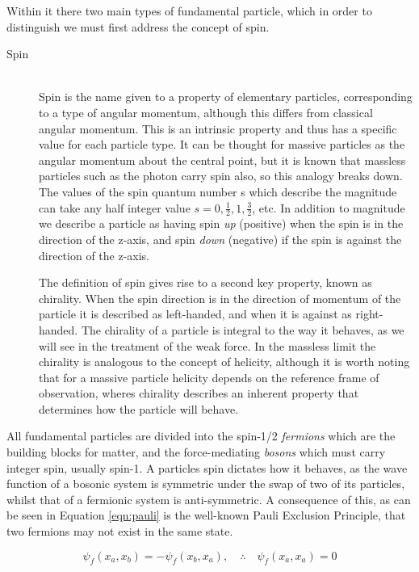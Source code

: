 Within it there two main types of fundamental particle, which in order to distinguish we must first address the concept of spin. 
\begin{description}
\item[Spin] \hfill \\
Spin is the name given to a property of elementary particles, corresponding to a type of angular momentum, although this differs from classical angular momentum. This is an intrinsic property and thus has a specific value for each particle type. It can be thought for massive particles as the angular momentum about the central point, but it is known that massless particles such as the photon carry spin also, so this analogy breaks down. The values of the spin quantum number s which describe the magnitude can take any half integer value $s=0, \frac{1}{2}, 1, \frac{3}{2}$, etc. In addition to magnitude we describe a particle as having spin \textit{up} (positive) when the spin is in the direction of the z-axis, and spin \textit{down} (negative) if the spin is against the direction of the z-axis. 

The definition of spin gives rise to a second key property, known as chirality. When the spin direction is in the direction of momentum of the particle it is described as left-handed, and when it is against as right-handed. The chirality of a particle is integral to the way it behaves, as we will see in the treatment of the weak force. In the massless limit  the chirality is analogous to the concept of helicity, although it is worth noting that for a massive particle helicity depends on the reference frame of observation, wheres chirality describes an inherent property that determines how the particle will behave.
\end{description}
All fundamental particles are divided into the spin-1/2 \textit{fermions} which are the building blocks for matter, and the force-mediating \textit{bosons} which must carry integer spin, usually spin-1.  A particles spin dictates how it behaves, as the wave function of a bosonic system is symmetric under the swap of two of its particles, whilst that of a fermionic system is anti-symmetric. A consequence of this, as can be seen in Equation \ref{eqn:pauli} is the well-known Pauli Exclusion Principle, that two fermions may not exist in the same state. 

\begin{equation}
\psi_{f}(x_{a},x_{b}) = -\psi_{f}(x_{b},x_{a}), \quad \therefore \quad \psi_{f}(x_{a},x_{a}) = 0
\label{eqn:pauli}
\end{equation}
 


